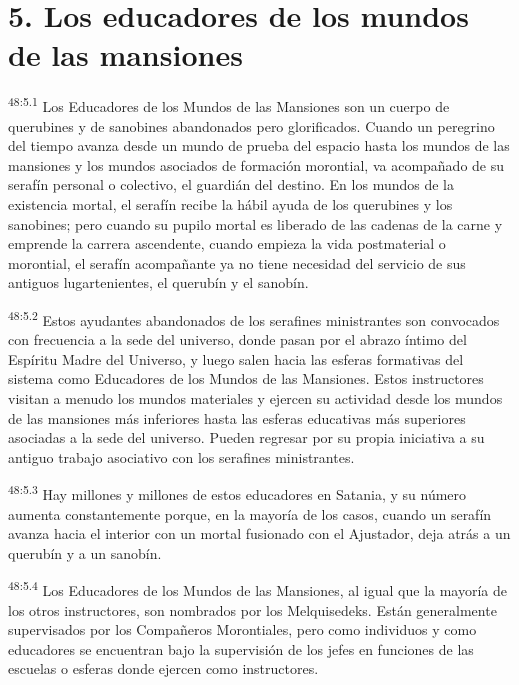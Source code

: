 \section*{5. Los educadores de los mundos de las mansiones}
\par
\textsuperscript{48:5.1} Los Educadores de los Mundos de las Mansiones son un cuerpo de querubines y de sanobines abandonados pero glorificados. Cuando un peregrino del tiempo avanza desde un mundo de prueba del espacio hasta los mundos de las mansiones y los mundos asociados de formación morontial, va acompañado de su serafín personal o colectivo, el guardián del destino. En los mundos de la existencia mortal, el serafín recibe la hábil ayuda de los querubines y los sanobines; pero cuando su pupilo mortal es liberado de las cadenas de la carne y emprende la carrera ascendente, cuando empieza la vida postmaterial o morontial, el serafín acompañante ya no tiene necesidad del servicio de sus antiguos lugartenientes, el querubín y el sanobín.

\par
\textsuperscript{48:5.2} Estos ayudantes abandonados de los serafines ministrantes son convocados con frecuencia a la sede del universo, donde pasan por el abrazo íntimo del Espíritu Madre del Universo, y luego salen hacia las esferas formativas del sistema como Educadores de los Mundos de las Mansiones. Estos instructores visitan a menudo los mundos materiales y ejercen su actividad desde los mundos de las mansiones más inferiores hasta las esferas educativas más superiores asociadas a la sede del universo. Pueden regresar por su propia iniciativa a su antiguo trabajo asociativo con los serafines ministrantes.

\par
\textsuperscript{48:5.3} Hay millones y millones de estos educadores en Satania, y su número aumenta constantemente porque, en la mayoría de los casos, cuando un serafín avanza hacia el interior con un mortal fusionado con el Ajustador, deja atrás a un querubín y a un sanobín.

\par
\textsuperscript{48:5.4} Los Educadores de los Mundos de las Mansiones, al igual que la mayoría de los otros instructores, son nombrados por los Melquisedeks. Están generalmente supervisados por los Compañeros Morontiales, pero como individuos y como educadores se encuentran bajo la supervisión de los jefes en funciones de las escuelas o esferas donde ejercen como instructores.

